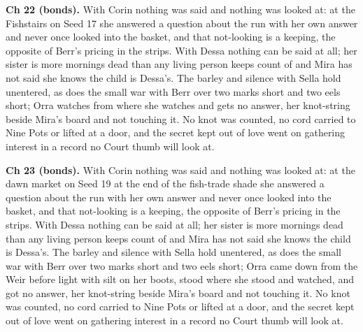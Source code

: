 \documentclass{design/chronicle}
\begin{document}
{\textbf{Ch 22 (bonds).} With Corin nothing was said and nothing was looked at: at the Fishstairs on Seed 17 she answered a question about the run with her own answer and never once looked into the basket, and that not-looking is a keeping, the opposite of Berr’s pricing in the strips. With Dessa nothing can be said at all; her sister is more mornings dead than any living person keeps count of and Mira has not said she knows the child is Dessa’s. The barley and silence with Sella hold unentered, as does the small war with Berr over two marks short and two eels short; Orra watches from where she watches and gets no answer, her knot-string beside Mira’s board and not touching it. No knot was counted, no cord carried to Nine Pots or lifted at a door, and the secret kept out of love went on gathering interest in a record no Court thumb will look at.

\textbf{Ch 23 (bonds).} With Corin nothing was said and nothing was looked at: at the dawn market on Seed 19 at the end of the fish-trade shade she answered a question about the run with her own answer and never once looked into the basket, and that not-looking is a keeping, the opposite of Berr’s pricing in the strips. With Dessa nothing can be said at all; her sister is more mornings dead than any living person keeps count of and Mira has not said she knows the child is Dessa’s. The barley and silence with Sella hold unentered, as does the small war with Berr over two marks short and two eels short; Orra came down from the Weir before light with silt on her boots, stood where she stood and watched, and got no answer, her knot-string beside Mira’s board and not touching it. No knot was counted, no cord carried to Nine Pots or lifted at a door, and the secret kept out of love went on gathering interest in a record no Court thumb will look at.

}
\end{document}
